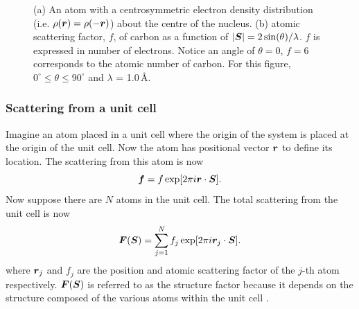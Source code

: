 \begin{figure}
\begin{subfigure}[b]{0.5\textwidth}
                        \caption{}
                        \label{fig:carbon atomic scattering factor}
                \end{subfigure}
                \caption[Centrosymmetric electron cloud and scattering factor from carbon]{(a) An atom with a centrosymmetric electron density distribution (i.e. $\rho(\boldsymbol{r}) = \rho(-\boldsymbol{r})$) about the centre of the nucleus.
                (b) atomic scattering factor, $f$, of carbon as a function of $|\boldsymbol{S}| = 2 \sin(\theta)/\lambda$.
                $f$ is expressed in number of electrons.
                Notice an angle of $\theta = 0$, $f=6$ corresponds to the atomic number of carbon.
                For this figure, $0^{\circ} \leq \theta \leq 90^{\circ}$ and $\lambda$ = 1.0$\,$\AA.}
        		\label{fig:Scattering from an atom}
            \end{figure}

        \subsubsection{Scattering from a unit cell}
        \label{subs:Scattering from a unit cell}
            Imagine an atom placed in a unit cell where the origin of the system is placed at the origin of the unit cell.
            Now the atom has positional vector $\boldsymbol{r}$ to define its location.
            The scattering from this atom is now
            \begin{equation}
                \boldsymbol{f} = f \exp[2 \pi i \boldsymbol{r} \cdot \boldsymbol{S}].
            \end{equation}
            Now suppose there are $N$ atoms in the unit cell. The total scattering from the unit cell is now
            \begin{equation}
                \boldsymbol{F}(\boldsymbol{S}) = \sum_{j=1}^N f_j \exp[2 \pi i \boldsymbol{r}_j \cdot \boldsymbol{S}].
                \label{eq:structure factor equation - summation}
            \end{equation}
            where $\boldsymbol{r}_j$ and $f_j$ are the position and atomic scattering factor of the $j$-th atom respectively.
            $\boldsymbol{F}(\boldsymbol{S})$ is referred to as the structure factor because it depends on the structure composed of the various atoms within the unit cell \cite{drenth2012}.

